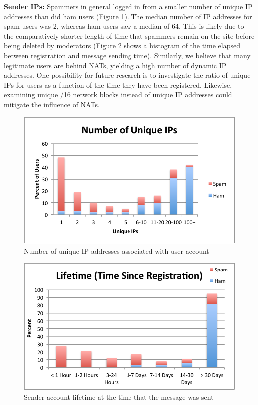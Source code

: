 \documentclass[preprint]{acm_proc_article-sp}
\begin{document}
\textbf{Sender IPs:} Spammers in general logged in from a smaller number of unique IP addresses 
than did ham users (Figure \ref{fig:uniqip}). The median number of IP addresses for 
spam users was 2, whereas ham users saw a median of 64. This is likely due to the comparatively 
shorter length of time that spammers remain on the site before being deleted by moderators (Figure 
\ref{fig:lifetime} shows a histogram of the time elapsed between registration and message sending 
time).  Similarly, we believe that many legitimate users are behind NATs, yielding a high number 
of dynamic IP addresses. One possibility for future research is to investigate the ratio of 
unique IPs for users as a function of the time they have been registered. Likewise, examining 
unique /16 network blocks instead of unique IP addresses could mitigate the influence of NATs.

\begin{figure}[h]
    \centering
    \includegraphics[width=\linewidth]{figures/unique-ips.pdf}
    \caption{Number of unique IP addresses associated with user account}
    \label{fig:uniqip}
\end{figure}

\begin{figure}[h]
    \centering
    \includegraphics[width=\linewidth]{figures/lifetime.pdf}
    \caption{Sender account lifetime at the time that the message was sent}
    \label{fig:lifetime}
\end{figure}
\end{document}
